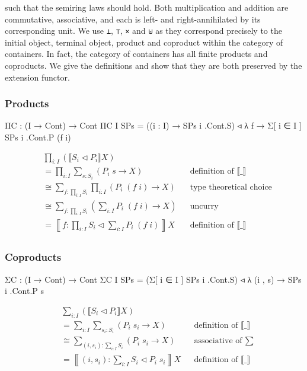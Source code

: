 such that the semiring laws should hold. Both multiplication and addition are commutative, associative, and each is left- and right-annihilated by its corresponding unit. We use \texttt{⊥}, \texttt{⊤}, \texttt{×} and \texttt{⊎} as they correspond precisely to the initial object, terminal object, product and coproduct within the category of containers. In fact, the category of containers has all finite products and coproducts. We give the definitions and show that they are both preserved by the extension functor.

\subsubsection*{Products}

\begin{code}
ΠC : (I → Cont) → Cont
ΠC {I} SPs = ((i : I) → SPs i .Cont.S) ◃ λ f → Σ[ i ∈ I ] SPs i .Cont.P (f i)
\end{code}

\begin{align*}
& \prod_{i : I} (\llbracket S_i \triangleleft P_i \rrbracket X) \\
&= \prod_{i : I} \sum_{s : S_i} (P_i \; s \to X) && \text{definition of $\llbracket \_ \rrbracket$} \\
&\cong \sum_{f : \prod_{i : I} S_i} \prod_{i : I} (P_i \; (f \; i) \to X) && \text{type theoretical choice} \\
&\cong \sum_{f : \prod_{i : I} S_i} \left( \sum_{i : I} P_i \; (f \; i) \to X \right) && \text{uncurry} \\
&= \left\llbracket f : \prod_{i : I} S_i \triangleleft \sum_{i : I} P_i \; (f \; i) \right\rrbracket X && \text{definition of $\llbracket \_ \rrbracket$} \\
\end{align*}

\subsubsection*{Coproducts}

\begin{code}
ΣC : (I → Cont) → Cont
ΣC {I} SPs = (Σ[ i ∈ I ] SPs i .Cont.S) ◃ λ (i , s) → SPs i .Cont.P s
\end{code}

\begin{align*}
& \sum_{i : I} (\llbracket S_i \triangleleft P_i \rrbracket X) \\
&= \sum_{i : I} \sum_{s_i : S_i} (P_i \; s_i \to X) && \text{definition of $\llbracket \_ \rrbracket$} \\
&\cong \sum_{(i , s_i) : \sum_{i : I} S_i} (P_i \; s_i \to X) && \text{associative of $\sum$} \\
&= \left\llbracket (i , s_i) : \sum_{i : I} S_i \triangleleft P_i \; s_i \right\rrbracket X && \text{definition of $\llbracket \_ \rrbracket$} \\
\end{align*}

